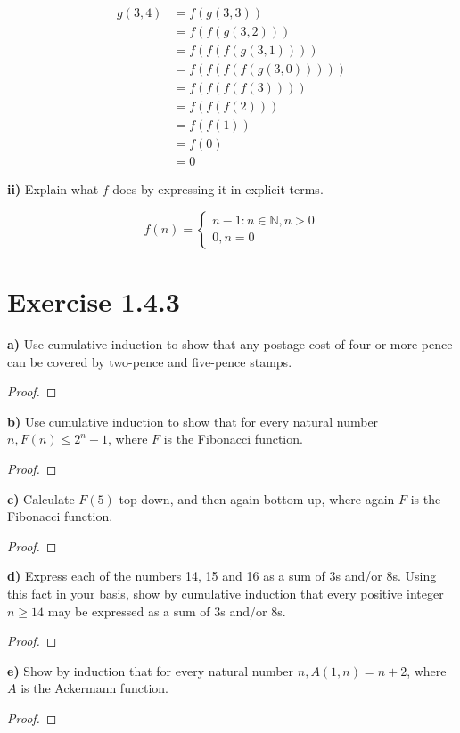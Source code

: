 \documentclass[titlepage, letterpaper, fleqn]{article}
\newcommand{\spacepls}{\vspace{5mm}}
\begin{document}
\begin{align*}
g(3,4) & = f(g(3,3)) \\
& = f(f(g(3,2)))\\
& = f(f(f(g(3,1))))\\
& = f(f(f(f(g(3,0)))))\\
& = f(f(f(f(3))))\\
& = f(f(f(2)))\\
& = f(f(1))\\
& = f(0)\\
& = 0
\end{align*}
\spacepls

\textbf{ii)} Explain what \(f\) does by expressing it in explicit terms.

\[f(n) =
\begin{cases}
n - 1 \colon n \in \mathbb{N}, n > 0\\
0, n = 0
\end{cases}
\]

\section{Exercise 1.4.3}

{\large \textbf{a)} Use cumulative induction to show that any postage cost of four or more pence can be covered by two-pence and five-pence stamps.}

\begin{proof}
\lipsum[1]
\end{proof}

\spacepls

{\large \textbf{b)} Use cumulative induction to show that for every natural number \(n, F(n) \leq 2^n - 1\), where \(F\) is the Fibonacci function.}

\begin{proof}
\lipsum[1]
\end{proof}

\spacepls

{\large \textbf{c)} Calculate \(F(5)\) top-down, and then again bottom-up, where again \(F\) is the Fibonacci function.}

\begin{proof}
\lipsum[1]
\end{proof}

\spacepls

{\large \textbf{d)} Express each of the numbers 14, 15 and 16 as a sum of 3s and/or 8s. Using this fact in your basis, show by cumulative induction that every positive integer \(n \geq 14\) may be expressed as a sum of 3s and/or 8s}.

\begin{proof}
\lipsum[1]
\end{proof}

\spacepls

{\large \textbf{e)} Show by induction that for every natural number \(n, A(1,n) = n+2\), where \(A\) is the Ackermann function.}

\begin{proof}
\lipsum[1]
\end{proof}
\end{document}
